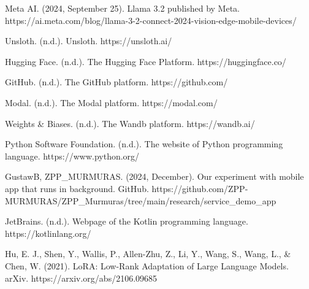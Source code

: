 \documentclass[licencjacka,en]{pracamgr}
\begin{document}
\begin{thebibliography}{99}
Meta AI. (2024, September 25). Llama 3.2 published by Meta. https://ai.meta.com/blog/llama-3-2-connect-2024-vision-edge-mobile-devices/

Unsloth. (n.d.). Unsloth. https://unsloth.ai/

Hugging Face. (n.d.). The Hugging Face Platform. https://huggingface.co/

GitHub. (n.d.). The GitHub platform. https://github.com/

Modal. (n.d.). The Modal platform. https://modal.com/

Weights \& Biases. (n.d.). The Wandb platform. https://wandb.ai/

Python Software Foundation. (n.d.). The website of Python programming language. https://www.python.org/

GustawB, ZPP\_MURMURAS. (2024, December). Our experiment with mobile app that runs in background. GitHub. https://github.com/ZPP-MURMURAS/ZPP\_Murmuras/tree/main/research/service\_demo\_app

JetBrains. (n.d.). Webpage of the Kotlin programming language. https://kotlinlang.org/

Hu, E. J., Shen, Y., Wallis, P., Allen-Zhu, Z., Li, Y., Wang, S., Wang, L., \& Chen, W. (2021). LoRA: Low-Rank Adaptation of Large Language Models. arXiv. https://arxiv.org/abs/2106.09685


\end{thebibliography}
\end{document}
